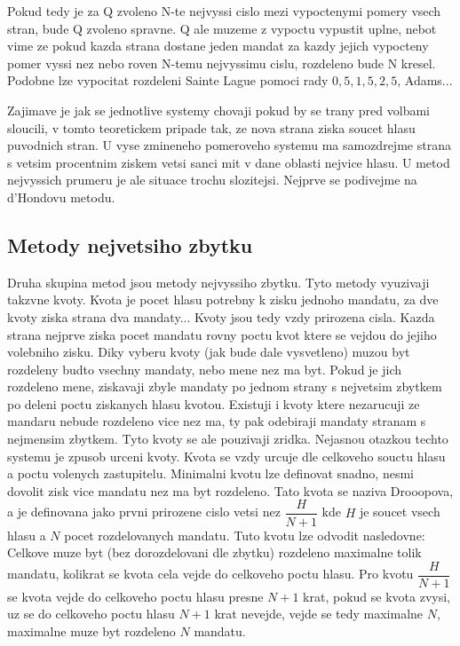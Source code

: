 \documentclass[12pt,a4paper]{report}
\begin{document}
Pokud tedy je za Q zvoleno N-te nejvyssi cislo mezi vypoctenymi pomery vsech stran, bude Q zvoleno spravne.
Q ale muzeme z vypoctu vypustit uplne, nebot vime ze pokud kazda strana dostane jeden mandat za kazdy jejich vypocteny pomer vyssi nez nebo roven N-temu nejvyssimu cislu, rozdeleno bude N kresel.
Podobne lze vypocitat rozdeleni Sainte Lague pomoci rady $0{,}5, 1{,}5, 2{,}5$, Adams... %

Zajimave je jak se jednotlive systemy chovaji pokud by se trany pred volbami sloucili, v tomto teoretickem pripade tak, ze nova strana ziska soucet hlasu puvodnich stran.
U vyse zmineneho pomeroveho systemu ma samozdrejme strana s vetsim procentnim ziskem vetsi sanci mit v dane oblasti nejvice hlasu.
U metod nejvyssich prumeru je ale situace trochu slozitejsi.
Nejprve se podivejme na d'Hondovu metodu.


\subsection{Metody nejvetsiho zbytku}
Druha skupina metod jsou metody nejvyssiho zbytku.
Tyto metody vyuzivaji takzvne kvoty.
Kvota je pocet hlasu potrebny k zisku jednoho mandatu, za dve kvoty ziska strana dva mandaty...
Kvoty jsou tedy vzdy prirozena cisla.
Kazda strana nejprve ziska pocet mandatu rovny poctu kvot ktere se vejdou do jejiho volebniho zisku.
Diky vyberu kvoty (jak bude dale vysvetleno) muzou byt rozdeleny budto vsechny mandaty, nebo mene nez ma byt.
Pokud je jich rozdeleno mene, ziskavaji zbyle mandaty po jednom strany s nejvetsim zbytkem po deleni poctu ziskanych hlasu kvotou.
Existuji i kvoty ktere nezarucuji ze mandaru nebude rozdeleno vice nez ma, ty pak odebiraji mandaty stranam s nejmensim zbytkem.
Tyto kvoty se ale pouzivaji zridka.
Nejasnou otazkou techto systemu je zpusob urceni kvoty.
Kvota se vzdy urcuje dle celkoveho souctu hlasu a poctu volenych zastupitelu.
Minimalni kvotu lze definovat snadno, nesmi dovolit zisk vice mandatu nez ma byt rozdeleno.
Tato kvota se naziva Drooopova, a je definovana jako prvni prirozene cislo vetsi nez $\dfrac{H}{N+1}$ kde $H$ je soucet vsech hlasu a $N$ pocet rozdelovanych mandatu.
Tuto kvotu lze odvodit nasledovne: Celkove muze byt (bez dorozdelovani dle zbytku) rozdeleno maximalne tolik mandatu, kolikrat se kvota cela vejde do celkoveho poctu hlasu.
Pro kvotu $\dfrac{H}{N+1}$ se kvota vejde do celkoveho poctu hlasu presne $N+1$ krat, pokud se kvota zvysi, uz se do celkoveho poctu hlasu $N+1$ krat nevejde, vejde se tedy maximalne $N$, maximalne muze byt rozdeleno $N$ mandatu.
\end{document}
